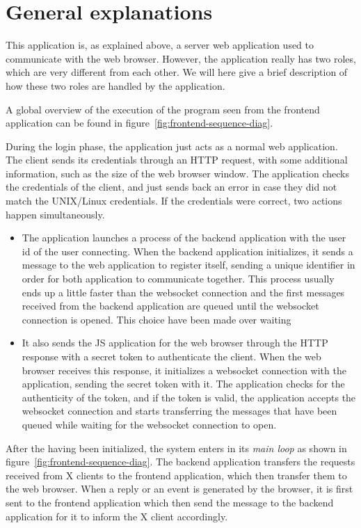 \section{General explanations}
% 
This application is, as explained above, a server web application used to 
communicate with the web browser. However, the application really has two 
roles, which are very different from each other. We will here give a brief 
description of how these two roles are handled by the application.

A global overview of the execution of the program seen from the frontend 
application can be found in figure~\ref{fig:frontend-sequence-diag}.


During the login phase, the application just acts as a normal web 
application. The client sends its credentials through an HTTP request,
with some additional information, such as the size of the web browser 
window. The application checks the credentials of the client, and 
just sends back an error in case they did not match the UNIX/Linux 
credentials. If the credentials were correct, two actions happen 
simultaneously. 
\begin{itemize}
\item The application launches a process of the backend 
  application with the user id of the user connecting.
%  
  When the backend application initializes, it sends a message to 
  the web application to register itself, sending a unique identifier 
  in order for both application to communicate together. 
%
  This process usually ends up a little faster than the websocket connection and 
  the first messages received from the backend application are queued until 
  the websocket connection is opened. This choice have been made over waiting %
\item It also sends the JS application for the web browser through the HTTP 
  response with a secret token to authenticate the client. 
%  
  When the web browser receives this response, it initializes a websocket 
  connection with the application, sending the secret token with it. 
%
  The application checks for the authenticity of the token, and if the token is valid, 
  the application accepts the websocket connection and starts transferring the messages 
  that have been queued while waiting for the websocket connection to open.
\end{itemize}

After the having been initialized, the system enters in its \emph{main loop} as shown 
in figure~\ref{fig:frontend-sequence-diag}. The backend application transfers the 
requests received from X clients to the frontend application, which then transfer 
them to the web browser. When a reply or an event is generated by the browser, 
it is first sent to the frontend application which then send the message to the backend 
application for it to inform the X client accordingly.

